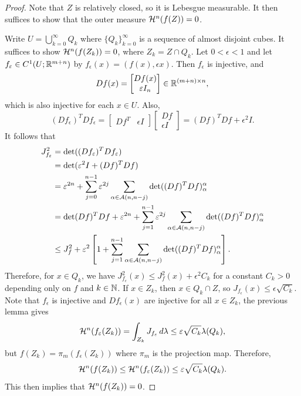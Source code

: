 \documentclass[a4paper]{article}
\renewcommand{\cupinfk}{\bigcup_{k=0}^\infty}
\renewcommand{\seqinfk}[1]{\{ #1 \}_{k=0}^\infty}
\renewcommand{\sumj}{\sum_{j=0}}
\begin{document}
\begin{proof}
  Note that $Z$ is relatively closed, so it is Lebesgue measurable. It
  then suffices to show that the outer measure $\mathcal{H}^n (f(Z)) = 0$.

  Write $U = \cupinfk Q_k$ where $\seqinfk{Q_k}$ is a sequence of almost
  disjoint cubes. It suffices to show $\mathcal{H}^n (f(Z_k)) = 0$, where $Z_k =
  Z \cap Q_k$. Let $0 < \epsilon < 1$ and let $f_\varepsilon \in C^1 (U;
  \mathbb{R}^{m+n})$ by $f_\epsilon(x) = (f(x), \epsilon x)$. Then $f_\epsilon$ is
  injective, and
  \[
    Df(x) = \begin{bmatrix}
      Df(x) \\
      \varepsilon I_n
    \end{bmatrix}
    \in \mathbb{R}^{(m + n) \times n},
  \]
  which is also injective for each $x \in U$. Also,
  \[
    (Df_\epsilon)^T Df_\epsilon =
    \begin{bmatrix}
      Df^T & \epsilon I
    \end{bmatrix}
    \begin{bmatrix}
      Df \\
      \epsilon I
    \end{bmatrix}
    = (Df)^T Df + \epsilon^2 I.
  \]
  It follows that
  \[
    \begin{aligned}
      J_{f_\epsilon}^2
       & = \det((Df_\epsilon)^T Df_\epsilon)                                       \\
       & = \det(\epsilon^2 I + (Df)^T Df)                                          \\
       & = \epsilon^{2n} + \sumj^{n-1} \epsilon^{2j}
      \sum_{\alpha \in \acal(n, n - j)} \det((Df)^T Df)_\alpha^\alpha              \\
       & = \det (Df)^T Df + \epsilon^{2n}
      + \sum_{j=1}^{n-1} \epsilon^{2j} \sum_{\alpha \in \acal(n, n-j)}
      \det((Df)^T Df)_\alpha^\alpha                                                \\
       & \leq J_f^2 + \epsilon^2 \left[ 1 +
                                   \sum_{j=1}^{n-1} \sum_{\alpha \in \acal(n, n-j)}
                                   \det((Df)^T Df)_\alpha^\alpha \right].
    \end{aligned}
  \]
  Therefore, for $x \in Q_k$, we have $J_{f_\epsilon}^2 (x) \leq J_f^2(x)
  + \epsilon^2 C_k$ for a constant $C_k > 0$ depending only on $f$ and $k
  \in \mathbb{N}$. If $x \in Z_k$, then $x \in Q_k \cap Z$, so $J_{f_\epsilon} (x)
  \leq \epsilon \sqrt{C_k}$. Note that $f_\epsilon$ is injective and
  $Df_\epsilon(x)$ are injective for all $x \in Z_k$, the previous lemma
  gives
  \[
    \mathcal{H}^n (f_\varepsilon(Z_k))
    = \int_{Z_k} J_{f_\varepsilon} \, d \lambda
    \leq \varepsilon \sqrt{C_k} \lambda(Q_k),
  \]
  but $f(Z_k) = \pi_{m} (f_\epsilon (Z_k))$ where $\pi_m$ is the
  projection map. Therefore,
  \[
    \mathcal{H}^n (f(Z_k)) \leq \mathcal{H}^n (f_\varepsilon (Z_k))
    \leq \varepsilon \sqrt{C_k} \lambda (Q_k).
  \]
  This then implies that $\mathcal{H}^n(f(Z_k)) = 0$.
\end{proof}
\end{document}
